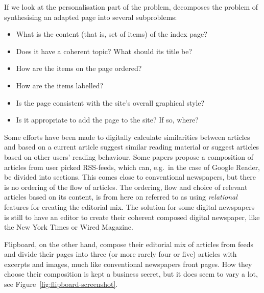 If we look at the personalisation part of the problem, \cite{perkowitz-Adaptive-Web-Sites} decomposes the problem of synthesising an adapted page into several subproblems:
\begin{itemize}\itemdist
	\item What is the content (that is, set of items) of the index page?
	\item Does it have a coherent topic? What should its title be?
	\item How are the items on the page ordered?
	\item How are the items labelled?
	\item Is the page consistent with the site's overall graphical style?
	\item Is it appropriate to add the page to the site? If so, where?
\end{itemize}

Some efforts have been made to digitally calculate similarities between articles and based on a current article suggest similar reading material or suggest articles based on other users' reading behaviour. Some papers propose a composition of articles from user picked RSS-feeds, which can, e.g.\ in the case of Google Reader, be divided into sections. This comes close to conventional newspapers, but there is no ordering of the flow of articles. The ordering, flow and choice of relevant articles based on its content, is from here on referred to as using \emph{relational} features for creating the editorial mix.
\clearpage
The solution for some digital newspapers is still to have an editor to create their coherent composed digital newspaper, like the New York Times or Wired Magazine.

Flipboard, on the other hand, compose their editorial mix of articles from feeds and divide their pages into three (or more rarely four or five) articles with excerpts and images, much like conventional newspapers front pages. How they choose their composition is kept a business secret, but it does seem to vary a lot, see Figure~\ref{fig:flipboard-screenshot}.

